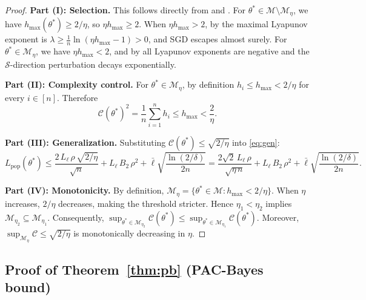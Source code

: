 \documentclass[11pt,a4paper]{article}
\theoremstyle{definition}
\theoremstyle{remark}
\newcommand{\cM}{\mathcal{M}}
\newcommand{\cS}{\mathcal{S}}
\newcommand{\cC}{\mathcal{C}}
\begin{document}
\begin{proof}
\textbf{Part (I): Selection.}\;
This follows directly from  and .
For $\theta^* \in \cM \setminus \cM_\eta$, we have $h_{\max}(\theta^*) \geq 2/\eta$,
so $\eta h_{\max} \geq 2$.  When $\eta h_{\max} > 2$, by 
the maximal Lyapunov exponent is
$\lambda \geq \frac{1}{n}\ln(\eta h_{\max} - 1) > 0$,
and SGD escapes almost surely.
For $\theta^* \in \cM_\eta$, we have $\eta h_{\max} < 2$, and by
 all Lyapunov exponents are negative and the $\cS$-direction
perturbation decays exponentially.

\textbf{Part (II): Complexity control.}\;
For $\theta^* \in \cM_\eta$, by definition $h_i \leq h_{\max} < 2/\eta$ for
every $i \in [n]$.  Therefore
\[
  \cC(\theta^*)^2 = \frac{1}{n}\sum_{i=1}^n h_i
  \leq h_{\max} < \frac{2}{\eta}.
\]

\textbf{Part (III): Generalization.}\;
Substituting $\cC(\theta^*) \leq \sqrt{2/\eta}$ into \eqref{eq:gen}:
\[
  L_{\mathrm{pop}}(\theta^*)
  \leq \frac{2\,L_\ell\,\rho\,\sqrt{2/\eta}}{\sqrt{n}}
  + L_\ell\, B_2\,\rho^2
  + \bar{\ell}\sqrt{\frac{\ln(2/\delta)}{2n}}
  = \frac{2\sqrt{2}\,L_\ell\,\rho}{\sqrt{\eta\, n}}
  + L_\ell\, B_2\,\rho^2
  + \bar{\ell}\sqrt{\frac{\ln(2/\delta)}{2n}}.
\]

\textbf{Part (IV): Monotonicity.}\;
By definition, $\cM_\eta = \{\theta^* \in \cM : h_{\max} < 2/\eta\}$.
When $\eta$ increases, $2/\eta$ decreases, making the threshold stricter.
Hence $\eta_1 < \eta_2$ implies $\cM_{\eta_2} \subseteq \cM_{\eta_1}$.
Consequently,
$\sup_{\theta^* \in \cM_{\eta_2}} \cC(\theta^*)
\leq \sup_{\theta^* \in \cM_{\eta_1}} \cC(\theta^*)$.
Moreover, $\sup_{\cM_\eta} \cC \leq \sqrt{2/\eta}$ is monotonically decreasing
in $\eta$.
\end{proof}

\subsection{Proof of Theorem~\ref{thm:pb} (PAC-Bayes bound)}
\end{document}
